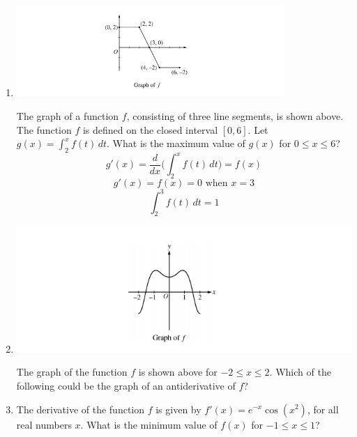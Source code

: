 \documentclass[12pt]{article}
\begin{document}
\begin{enumerate}
    \item 
    \begin{center}
        \includegraphics[width=4in]{FEP3.png}
    \end{center}
    The graph of a function $f$, consisting of three line segments, is shown above. The function $f$ is defined on the closed interval $[0, 6]$. Let $g(x) = \int_{2}^{x} f(t) \, dt$. What is the maximum value of $g(x)$ for $0 \leq x \leq 6$?
    $$g'(x)  = \frac{d}{dx}\biggr(\int_{2}^{x} f(t) \, dt\biggr) = f(x)$$
    $$g'(x)=f(x)=0 \text{ when } x= 3$$
    $$\int_{2}^{3} f(t) \, dt = \boxed{1}$$
    \item  
    \begin{center}
        \includegraphics[width=5in]{FEP4.png}
    \end{center}
    The graph of the function $f$ is shown above for $-2 \leq x \leq 2$. Which of the following could be the graph of an antiderivative of $f$?
    \begin{center}
    \end{center}
    \item The derivative of the function $f$ is given by $f'(x)=e^{-x}\cos(x^2)$, for all real numbers $x$. What is the minimum value of $f(x)$ for $-1 \leq x \leq 1$?

\end{enumerate}
\end{document}
